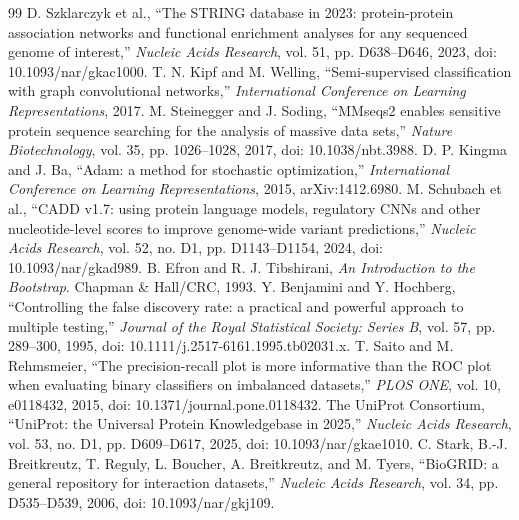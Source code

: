 \documentclass[conference]{IEEEtran}
\begin{document}
\begin{thebibliography}{99}
 D. Szklarczyk et al., ``The STRING database in 2023: protein-protein association networks and functional enrichment analyses for any sequenced genome of interest,'' \emph{Nucleic Acids Research}, vol. 51, pp. D638--D646, 2023, doi: 10.1093/nar/gkac1000.
 T. N. Kipf and M. Welling, ``Semi-supervised classification with graph convolutional networks,'' \emph{International Conference on Learning Representations}, 2017.
 M. Steinegger and J. Soding, ``MMseqs2 enables sensitive protein sequence searching for the analysis of massive data sets,'' \emph{Nature Biotechnology}, vol. 35, pp. 1026--1028, 2017, doi: 10.1038/nbt.3988.
 D. P. Kingma and J. Ba, ``Adam: a method for stochastic optimization,'' \emph{International Conference on Learning Representations}, 2015, arXiv:1412.6980.
 M. Schubach et al., ``CADD v1.7: using protein language models, regulatory CNNs and other nucleotide-level scores to improve genome-wide variant predictions,'' \emph{Nucleic Acids Research}, vol. 52, no. D1, pp. D1143--D1154, 2024, doi: 10.1093/nar/gkad989.
 B. Efron and R. J. Tibshirani, \emph{An Introduction to the Bootstrap}. Chapman \& Hall/CRC, 1993.
 Y. Benjamini and Y. Hochberg, ``Controlling the false discovery rate: a practical and powerful approach to multiple testing,'' \emph{Journal of the Royal Statistical Society: Series B}, vol. 57, pp. 289--300, 1995, doi: 10.1111/j.2517-6161.1995.tb02031.x.
 T. Saito and M. Rehmsmeier, ``The precision-recall plot is more informative than the ROC plot when evaluating binary classifiers on imbalanced datasets,'' \emph{PLOS ONE}, vol. 10, e0118432, 2015, doi: 10.1371/journal.pone.0118432.
 The UniProt Consortium, ``UniProt: the Universal Protein Knowledgebase in 2025,'' \emph{Nucleic Acids Research}, vol. 53, no. D1, pp. D609--D617, 2025, doi: 10.1093/nar/gkae1010.
 C. Stark, B.-J. Breitkreutz, T. Reguly, L. Boucher, A. Breitkreutz, and M. Tyers, ``BioGRID: a general repository for interaction datasets,'' \emph{Nucleic Acids Research}, vol. 34, pp. D535--D539, 2006, doi: 10.1093/nar/gkj109.
\end{thebibliography}
\end{document}

